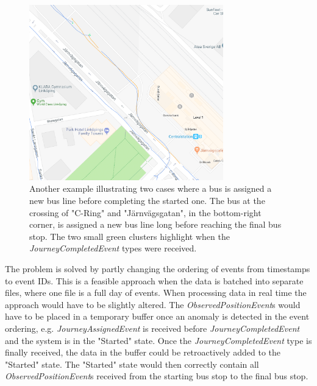 \begin{figure}[t!]
    \centering
    \includegraphics[width=0.75\textwidth]{figures/assigned_completed_problem}
    \caption{Another example illustrating two cases where a bus is assigned a new bus line before completing the started one.
    The bus at the crossing of "C-Ring" and "Järnvägsgatan", in the bottom-right corner, is assigned a new bus line long before reaching the final bus stop.
    The two small green clusters highlight when the \textit{JourneyCompletedEvent} types were received.}
    \label{fig:assigned-before-completed}
\end{figure}

The problem is solved by partly changing the ordering of events from timestamps to event IDs.
This is a feasible approach when the data is batched into separate files, where one file is a full day of events.
When processing data in real time the approach would have to be slightly altered.
The \textit{ObservedPositionEvent}s would have to be placed in a temporary buffer once an anomaly is detected in the event ordering, e.g. \textit{JourneyAssignedEvent} is received before \textit{JourneyCompletedEvent} and the system is in the "Started" state.
Once the \textit{JourneyCompletedEvent} type is finally received, the data in the buffer could be retroactively added to the "Started" state.
The "Started" state would then correctly contain all \textit{ObservedPositionEvent}s received from the starting bus stop to the final bus stop.

